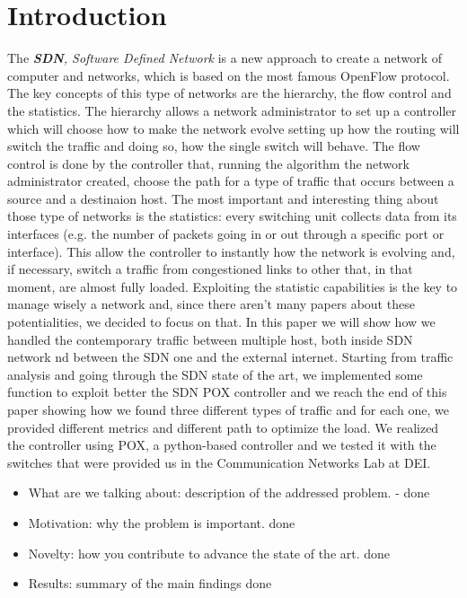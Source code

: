 \documentclass[conference,10pt]{IEEEtran}
\begin{document}
\section{Introduction}\label{sec:intro}
The \textit{\textbf{SDN}, Software Defined Network} is a new approach to create a network of computer and networks, which is based on the
most famous OpenFlow protocol. The key concepts of this type of networks are the hierarchy, the flow control and the statistics.
The hierarchy allows a network administrator to set up a controller which will choose how to make the network evolve setting up
how the routing will switch the traffic and doing so, how the single switch will behave.
The flow control is done by the controller that, running the algorithm the network administrator created, choose the path for a
type of traffic that occurs between a source and a destinaion host.
The most important and interesting thing about those type of networks is the statistics: every switching unit collects data from its
interfaces (e.g. the number of packets going in or out through a specific port or interface). This allow the controller to instantly
how the network is evolving and, if necessary, switch a traffic from congestioned links to other that, in that moment, are almost fully loaded.
Exploiting the statistic capabilities is the key to manage wisely a network and, since there aren't many papers about these potentialities,
we decided to focus on that. In this paper we will show how we handled the contemporary traffic between multiple host, both inside SDN network
nd between the SDN one and the external internet. Starting from traffic analysis and going through the SDN state of the art, we implemented some function
to exploit better the SDN POX controller and we reach the end of this paper showing how we found three different types of traffic and
for each one, we provided different metrics and different path to optimize the load. We realized the controller using POX, a python-based controller
and we tested it with the switches that were provided us in the Communication Networks Lab at DEI.
\begin{itemize}
	\item What are we talking about: description of the addressed problem. - done
\item Motivation: why the problem is important. done
\item Novelty: how you contribute to advance the state of the art. done
\item Results: summary of the main findings  done
\end{itemize}
\end{document}
